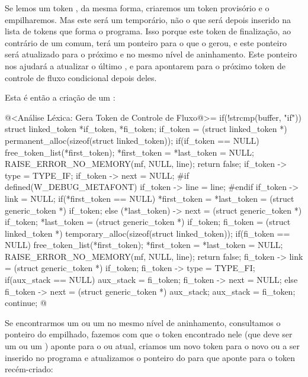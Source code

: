 Se lemos um token , da mesma forma, criaremos um
token  provisório e o empilharemos. Mas este será
um  temporário, não o que será depois inserido na lista
de tokens que forma o programa. Isso porque este token de finalização,
ao contrário de um  comum, terá um ponteiro para
o  que o gerou, e este ponteiro será atualizado para o
próximo  e  no mesmo nível de
aninhamento. Este ponteiro nos ajudará a atualizar o
último ,  e  para
apontarem para o próximo token de controle de fluxo condicional depois
deles.

Esta é então a criação de um :

\iniciocodigo
@<Análise Léxica: Gera Token de Controle de Fluxo@>=
if(!strcmp(buffer, "if")){
  struct linked_token *if_token, *fi_token;
  if_token = (struct linked_token *)
               permanent_alloc(sizeof(struct linked_token));
  if(if_token == NULL){
    free_token_list(*first_token);
    *first_token = *last_token = NULL;
    RAISE_ERROR_NO_MEMORY(mf, NULL, line);
    return false;
  }
  if_token -> type = TYPE_IF;
  if_token -> next = NULL;
#if defined(W_DEBUG_METAFONT)
  if_token -> line = line;
#endif
  if_token -> link = NULL;
  if(*first_token == NULL)
    *first_token = *last_token = (struct generic_token *) if_token;
  else{
    (*last_token) -> next = (struct generic_token *) if_token;
    *last_token = (struct generic_token *) if_token;
  }
  fi_token = (struct linked_token *)
               temporary_alloc(sizeof(struct linked_token));
  if(fi_token == NULL){
    free_token_list(*first_token);
    *first_token = *last_token = NULL;
    RAISE_ERROR_NO_MEMORY(mf, NULL, line);
    return false;
  }
  fi_token -> link = (struct generic_token *) if_token;
  fi_token -> type = TYPE_FI;
  if(aux_stack == NULL){
    aux_stack = fi_token;
    fi_token -> next = NULL;
  }
  else{
    fi_token -> next = (struct generic_token *) aux_stack;
    aux_stack = fi_token;
  }
  continue;
}
@
\fimcodigo

Se encontrarmos um  ou um  no
mesmo nível de aninhamento, consultamos o ponteiro do 
empilhado, fazemos com que o token encontrado nele (que deve ser
um  ou um ) aponte para
o  ou  atual, criamos um novo
token para o novo  ou  a ser
inserido no programa e atualizamos o ponteiro do  para
que aponte para o token recém-criado:

